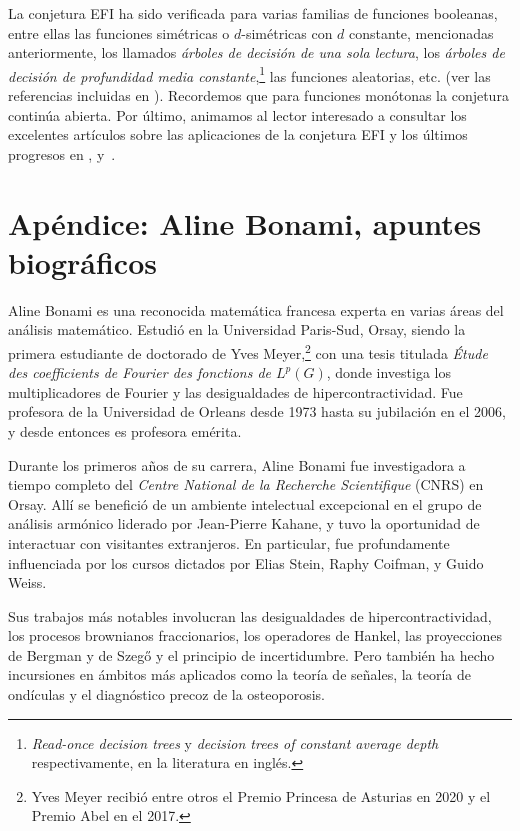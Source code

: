 \documentclass[autocontact]{gaceta}
\begin{document}
La conjetura EFI ha sido verificada para varias familias de funciones booleanas, entre ellas las funciones simétricas o $d$-simétricas con $d$ constante, mencionadas anteriormente, los llamados \emph{árboles de decisión de una sola lectura}, los \emph{árboles de decisión de profundidad media constante},\footnote{\emph{Read-once decision trees} y \emph{decision trees of constant average depth} respectivamente, en la literatura en inglés.} las funciones aleatorias, etc. (ver las referencias incluidas en \cite{BS25}). Recordemos que para funciones monótonas la conjetura continúa abierta. Por último, animamos al lector interesado a consultar los excelentes artículos sobre las aplicaciones de la conjetura EFI y los últimos progresos en \cite{WWW14}, \cite{KKL+20} y~\cite{Kal20}.

\section*{Apéndice: Aline Bonami, apuntes biográficos}

Aline Bonami es una reconocida matemática francesa experta en varias áreas del análisis matemático. Estudió en la Universidad Paris-Sud, Orsay, siendo la primera estudiante de doctorado de Yves Meyer,\footnote{Yves Meyer recibió entre otros el Premio Princesa de Asturias en 2020 y el Premio Abel en el 2017.} con una tesis titulada \emph{Étude des coefficients de Fourier des fonctions de $L^p(G)$}, donde investiga los multiplicadores de Fourier y las desigualdades de hipercontractividad.
Fue profesora de la Universidad de Orleans desde 1973 hasta su jubilación en el 2006, y desde entonces es profesora emérita.

Durante los primeros años de su carrera, Aline Bonami fue investigadora a tiempo completo del \emph{Centre National de la Recherche Scientifique} (CNRS) en Orsay. Allí se benefició de un ambiente intelectual excepcional en el grupo de análisis armónico liderado por Jean-Pierre Kahane, y tuvo la oportunidad de interactuar con visitantes extranjeros. En particular, fue profundamente influenciada por los cursos dictados por Elias Stein, Raphy Coifman, y Guido Weiss.

Sus trabajos más notables involucran las desigualdades de hipercontractividad, los procesos brownianos fraccionarios, los operadores de Hankel, las proyecciones de Bergman y de Szeg\H{o} y el principio de incertidumbre. Pero también ha hecho incursiones en ámbitos más aplicados como la teoría de señales, la teoría de ondículas y el diagnóstico precoz de la osteoporosis.
\end{document}
